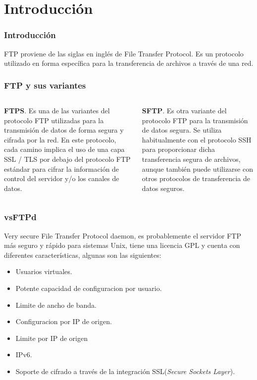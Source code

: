 \section{Introducci\'on}
  \begin{frame}
    \frametitle{Introducci\'on}
    FTP proviene de las siglas en inglés de File Transfer Protocol. Es un protocolo utilizado en forma específica para la transferencia de archivos a través de una red. \\
  \end{frame}

  \begin{frame}
    \frametitle{FTP y sus variantes}
    \begin{columns}[t]
     {\bf FTPS}. Es una de las variantes del protocolo FTP utilizadas para la transmisión de datos de forma segura y cifrada por la red. En este protocolo, cada camino implica el uso de una capa SSL / TLS por debajo del protocolo FTP estándar para cifrar la información de control del servidor y/o los canales de datos.
     
     {\bf SFTP}. Es otra variante del protocolo FTP para la transmisión de datos segura. Se utiliza habitualmente con el protocolo SSH para proporcionar dicha transferencia segura de archivos, aunque también puede utilizarse con otros protocolos de transferencia de datos seguros.
     \end{columns}
  \end{frame}


  \begin{frame}
    \frametitle{vsFTPd}
    Very secure File Transfer Protocol daemon, es probablemente el servidor FTP m\'as seguro y r\'apido para sistemas Unix, tiene una licencia GPL y cuenta con diferentes caracter\'isticas, algunas son las siguientes:
    \begin{itemize}
    \item Usuarios virtuales.
    \item Potente capacidad de configuracion por usuario.
    \item Limite de ancho de banda.
    \item Configuracion por IP de origen.
    \item Limite por IP de origen
    \item IPv6.
    \item Soporte de cifrado a través de la integración SSL({\em Secure Sockets Layer}).
  	\end{itemize}
  \end{frame}
